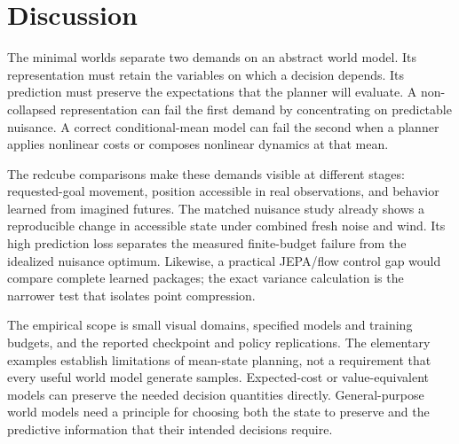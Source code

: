 \section{Discussion}
\label{sec:limitations}

The minimal worlds separate two demands on an abstract world model. Its representation must retain
the variables on which a decision depends. Its prediction must preserve the expectations that the
planner will evaluate. A non-collapsed representation can fail the first demand by concentrating on
predictable nuisance. A correct conditional-mean model can fail the second when a planner applies
nonlinear costs or composes nonlinear dynamics at that mean.

The redcube comparisons make these demands visible at different stages: requested-goal movement,
position accessible in real observations, and behavior learned from imagined futures. The matched
nuisance study already shows a reproducible change in accessible state under combined fresh noise
and wind. Its high prediction loss separates the measured finite-budget failure from the idealized
nuisance optimum. Likewise, a practical JEPA/flow control gap would compare complete learned
packages; the exact variance calculation is the narrower test that isolates point compression.

The empirical scope is small visual domains, specified models and training budgets, and the
reported checkpoint and policy replications. The elementary examples establish limitations of
mean-state planning, not a requirement that every useful world model generate samples. Expected-cost
or value-equivalent models can preserve the needed decision quantities directly. General-purpose
world models need a principle for choosing both the state to preserve and the predictive information
that their intended decisions require.
